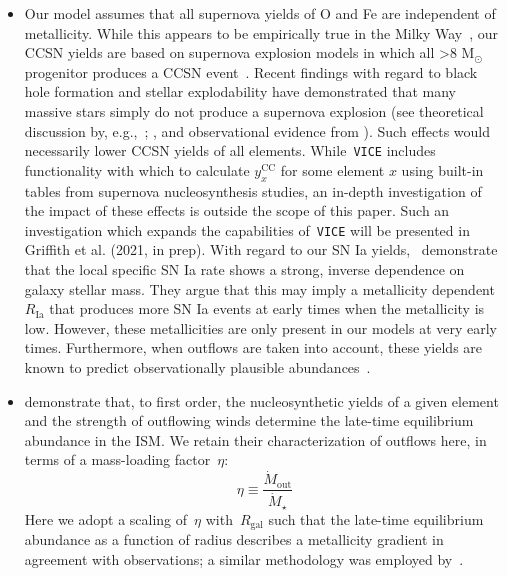 \documentclass[fleqn, usenatbib]{mnras}
\begin{document}
\begin{itemize}
	\item Our model assumes that all supernova yields of O and Fe are 
	independent of metallicity. While this appears to be empirically true in 
	the Milky Way~\citep{Weinberg2019, Griffith2020}, our CCSN yields are based 
	on supernova explosion models in which all >8 M$_\odot$ progenitor produces 
	a CCSN event~\citep[e.g.][]{Chieffi2004, Chieffi2013}. Recent findings 
	with regard to black hole formation and stellar explodability have 
	demonstrated that many massive stars simply do not produce a supernova 
	explosion (see theoretical discussion by, e.g.,~\citealp{Pejcha2015}; 
	\citealp{Sukhbold2016}, and observational evidence from 
	\citealp{Gerke2015, Adams2017, Basinger2020}). Such effects would 
	necessarily lower CCSN yields of all elements. While~\texttt{VICE} includes 
	functionality with which to calculate $y_x^\text{CC}$ for some element $x$ 
	using built-in tables from supernova nucleosynthesis studies, an in-depth 
	investigation of the impact of these effects is outside the scope of this 
	paper. Such an investigation which expands the capabilities of~\texttt{VICE} 
	will be presented in Griffith et al. (2021, in prep). With regard to our SN 
	Ia yields,~\citet{Brown2019} demonstrate that the local specific SN Ia rate 
	shows a strong, inverse dependence on galaxy stellar mass. They argue that 
	this may imply a metallicity dependent~$R_\text{Ia}$ that produces more SN 
	Ia events at early times when the metallicity is low. However, these 
	metallicities are only present in our models at very early times. 
	Furthermore, when outflows are taken into account, these yields are known 
	to predict observationally plausible abundances~\citep{Andrews2017, 
	Weinberg2017}. 

	\item \citet{Weinberg2017} demonstrate that, to first order, the 
	nucleosynthetic yields of a given element and the strength of outflowing 
	winds determine the late-time equilibrium abundance in the ISM. We retain 
	their characterization of outflows here, in terms of a mass-loading 
	factor~$\eta$: 
	\begin{equation} 
	\eta \equiv \frac{\dot{M}_\text{out}}{\dot{M}_\star} 
	\end{equation} 
	Here we adopt a scaling of~$\eta$ with~$R_\text{gal}$ such that the 
	late-time equilibrium abundance as a function of radius describes a 
	metallicity gradient in agreement with observations; a similar methodology 
	was employed by~\citet{Nidever2014}. 


\end{itemize}
\end{document}
